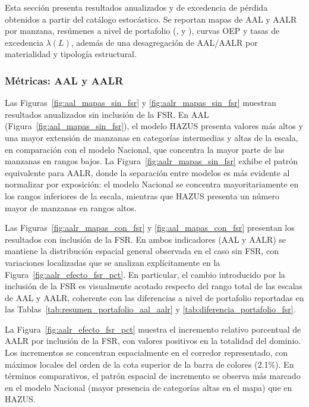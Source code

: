 Esta sección presenta resultados anualizados y de excedencia de pérdida obtenidos a partir del catálogo estocástico. Se reportan mapas de AAL y AALR por manzana, resúmenes a nivel de portafolio (\pSixteen{}, \pFifty{} y \pEightyFour{}), curvas OEP y tasas de excedencia $\lambda(L)$, además de una desagregación de AAL/AALR por materialidad y tipología estructural.

\subsubsection{Métricas: AAL y AALR}
\label{subsubsec:aal_aalr_def}

Las Figuras~\ref{fig:aal_mapas_sin_fsr} y \ref{fig:aalr_mapas_sin_fsr} muestran resultados anualizados sin inclusión de la FSR. En AAL (Figura~\ref{fig:aal_mapas_sin_fsr}), el modelo HAZUS presenta valores más altos y una mayor extensión de manzanas en categorías intermedias y altas de la escala, en comparación con el modelo Nacional, que concentra la mayor parte de las manzanas en rangos bajos. La Figura~\ref{fig:aalr_mapas_sin_fsr} exhibe el patrón equivalente para AALR, donde la separación entre modelos es más evidente al normalizar por exposición: el modelo Nacional se concentra mayoritariamente en los rangos inferiores de la escala, mientras que HAZUS presenta un número mayor de manzanas en rangos altos.

Las Figuras~\ref{fig:aalr_mapas_con_fsr} y \ref{fig:aal_mapas_con_fsr} presentan los resultados con inclusión de la FSR. En ambos indicadores (AAL y AALR) se mantiene la distribución espacial general observada en el caso sin FSR, con variaciones localizadas que se analizan explícitamente en la Figura~\ref{fig:aalr_efecto_fsr_pct}. En particular, el cambio introducido por la inclusión de la FSR es visualmente acotado respecto del rango total de las escalas de AAL y AALR, coherente con las diferencias a nivel de portafolio reportadas en las Tablas~\ref{tab:resumen_portafolio_aal_aalr} y \ref{tab:diferencia_portafolio_fsr}.

La Figura~\ref{fig:aalr_efecto_fsr_pct} muestra el incremento relativo porcentual de AALR por inclusión de la FSR, con valores positivos en la totalidad del dominio. Los incrementos se concentran espacialmente en el corredor representado, con máximos locales del orden de la cota superior de la barra de colores (2.1\%). En términos comparativos, el patrón espacial de incremento se observa más marcado en el modelo Nacional (mayor presencia de categorías altas en el mapa) que en HAZUS.

